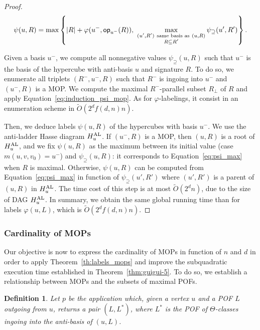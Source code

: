 \documentclass{article}
\newtheorem{definition}{Definition}
\newcommand{\set}[1]{\left\{ #1 \right\}}
\newcommand{\card}[1]{\left| #1 \right|}
\newcommand{\opp}{\mbox{\textsf{op}}}
\newcommand{\hual}{H_u^{\mbox{\scriptsize{AL}}}}
\newcommand{\psis}{\psi_{\supseteq}}
\begin{document}
\begin{proof}
\begin{equation}
    \psi(u,R) = \max \set{\card{R} + \varphi(u^-,\opp_{u^-}(R)),~ \max\limits_{\substack{(u',R') ~\mbox{\scriptsize{same basis as}}~ (u,R) \\ R \subseteq R'}} \psis(u',R')}.
    \label{eq:psi_max}
\end{equation}

Given a basis $u^-$, we compute all nonnegative values $\psis(u,R)$ such that $u^-$ is the basis of the hypercube with anti-basis $u$ and signature $R$. To do so, we enumerate all triplets $(R^-,u^-,R)$ such that $R^-$ is ingoing into $u^-$ and $(u^-,R)$ is a MOP. We compute the maximal $R^-$-parallel subset $R_{\perp}$ of $R$ and apply Equation~\eqref{eq:induction_psi_mop}. As for $\varphi$-labelings, it consist in an enumeration scheme in $\tilde{O}(2^df(d,n)n)$.

Then, we deduce labels $\psi(u,R)$ of the hypercubes with basis $u^-$. We use the anti-ladder Hasse diagram $\hual$. If $(u^-,R)$ is a MOP, then $(u,R)$ is a root of $\hual$, and we fix $\psi(u,R)$ as the maximum between its initial value (case $m(u,v,v_0) = u^-$) and $\psis(u,R)$: it corresponds to Equation~\eqref{eq:psi_max} when $R$ is maximal. Otherwise, $\psi(u,R)$ can be computed from Equation~\eqref{eq:psi_max} in function of $\psis(u',R')$ where $(u',R')$ is a parent of $(u,R)$ in $\hual$. The time cost of this step is at most $\tilde{O}(2^dn)$, due to the size of DAG $\hual$. In summary, we obtain the same global running time than for labels $\varphi(u,L)$, which is $\tilde{O}(2^df(d,n)n)$.
\end{proof}

\subsubsection{Cardinality of MOPs} \label{subsubsec:bound_mop}

Our objective is now to express the cardinality of MOPs in function of $n$ and $d$ in order to apply Theorem~\ref{th:labels_mops} and improve the subquadratic execution time established in Theorem~\ref{thm:guigui-5}. To do so, we establish a relationship between MOPs and the subsets of maximal POFs.

\begin{definition}
Let $p$ be the application which, given a vertex $u$ and a POF $L$ outgoing from $u$, returns a pair $(L,L^*)$, where $L^*$ is the POF of $\Theta$-classes ingoing into the anti-basis of $(u,L)$.
\end{definition}
\end{document}
